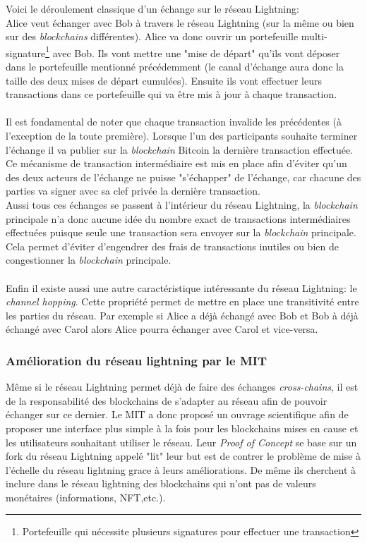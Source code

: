 Voici le déroulement classique d'un échange sur le réseau Lightning:\\ Alice veut échanger avec Bob à travers le réseau Lightning (sur la même ou bien sur des \textit{\gls{blockchain}s} différentes). 
Alice va donc ouvrir un portefeuille multi-signature\footnote{Portefeuille qui nécessite plusieurs signatures pour effectuer une transaction} avec Bob. Ils vont mettre une "mise de départ" qu'ils vont déposer dans le portefeuille mentionné précédemment (le canal d'échange aura donc la taille des deux mises de départ cumulées).
Ensuite ils vont effectuer leurs transactions dans ce portefeuille qui va être mis à jour à chaque transaction.\\ \\ 
Il est fondamental de noter que chaque transaction invalide les précédentes (à l'exception de la toute première). Lorsque l'un des participants souhaite terminer l'échange il va publier sur la \textit{\gls{blockchain}} Bitcoin la dernière transaction effectuée.
Ce mécanisme de transaction intermédiaire est mis en place afin d'éviter qu'un des deux acteurs de l'échange ne puisse "s'échapper" de l'échange, car chacune des parties va signer avec sa clef privée la dernière transaction. \\
Aussi tous ces échanges se passent à l'intérieur du réseau Lightning, la \textit{\gls{blockchain}} principale n'a donc aucune idée du nombre exact de transactions intermédiaires effectuées puisque seule une transaction sera envoyer sur la \textit{\gls{blockchain}} principale. 
Cela permet d'éviter d'engendrer des frais de transactions inutiles ou bien de congestionner la \textit{\gls{blockchain}} principale.\\ \\
 Enfin il existe aussi une autre caractéristique intéressante du réseau Lightning: le \textit{channel hopping}. 
Cette propriété permet de mettre en place une transitivité entre les parties du réseau. Par exemple si Alice a déjà échangé avec Bob et Bob à déjà échangé avec Carol alors Alice pourra échanger avec Carol et vice-versa. 


\subsubsection{Amélioration du réseau lightning par le MIT}

Même si le réseau Lightning permet déjà de faire des échanges \textit{\gls{cross-chain}s}\cite{lightningCrossChain}, il est de la responsabilité des \gls{blockchain}s de s'adapter au réseau afin de pouvoir échanger sur ce dernier.
Le MIT a donc proposé un ouvrage scientifique\cite{mathus2018lightning} afin de proposer une interface plus simple à la fois pour les \gls{blockchain}s mises en cause et les utilisateurs souhaitant utiliser le réseau.
Leur \textit{Proof of Concept}\cite{pocMIT} se base sur un fork du réseau Lightning appelé "lit" leur but est de contrer le problème de mise à l'échelle du réseau lightning grace à leurs améliorations.
De même ils cherchent à inclure dans le réseau lightning des \gls{blockchain}s qui n'ont pas de valeurs monétaires (informations, NFT,etc.).

